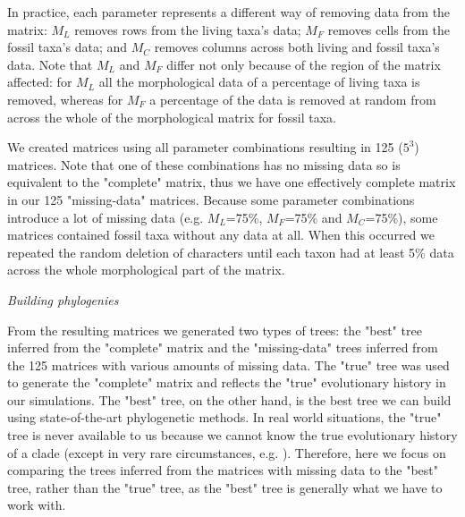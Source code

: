 \documentclass[12pt,letterpaper]{article}
\renewcommand{\subsection}[1]{%
\bigskip
\begin{center}
\begin{large}
\normalfont\itshape #1
\end{large}
\end{center}}
\begin{document}
In practice, each parameter represents a different way of removing data from the matrix: $M_{L}$ removes rows from the living taxa's data; $M_{F}$ removes cells from the fossil taxa's data; and $M_{C}$ removes columns across both living and fossil taxa's data. Note that $M_{L}$ and $M_{F}$ differ not only because of the region of the matrix affected: for $M_{L}$ all the morphological data of a percentage of living taxa is removed, whereas for $M_{F}$ a percentage of the data is removed at random from across the whole of the morphological matrix for fossil taxa.

We created matrices using all parameter combinations resulting in 125 ($5^3$) matrices. Note that one of these combinations has no missing data so is equivalent to the "complete" matrix, thus we have one effectively complete matrix in our 125 "missing-data" matrices. Because some parameter combinations introduce a lot of missing data (e.g. $M_L$=75\%, $M_F$=75\% and $M_C$=75\%), some matrices contained fossil taxa without any data at all. When this occurred we repeated the random deletion of characters until each taxon had at least 5\% data across the whole morphological part of the matrix.


\subsection{Building phylogenies}
From the resulting matrices we generated two types of trees: the "best" tree inferred from the "complete" matrix and the "missing-data" trees inferred from the 125 matrices with various amounts of missing data. The "true" tree was used to generate the "complete" matrix and reflects the "true" evolutionary history in our simulations. The "best" tree, on the other hand, is the best tree we can build using state-of-the-art phylogenetic methods. In real world situations, the "true" tree is never available to us because we cannot know the true evolutionary history of a clade (except in very rare circumstances, e.g. \citealt{rozen2005}). Therefore, here we focus on comparing the trees inferred from the matrices with missing data to the "best" tree, rather than the "true" tree, as the "best" tree is generally what we have to work with.
\end{document}

